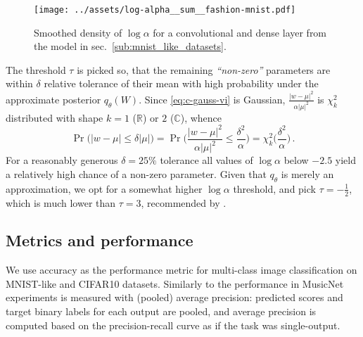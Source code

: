 \documentclass[a4paper,10pt]{article}
\newcommand{\real}{\mathbb{R}}
\newcommand{\cplx}{\mathbb{C}}
\begin{document}
\begin{figure}[ht]
  \centering
  \texttt{[image: ../assets/log-alpha\_\_sum\_\_fashion-mnist.pdf]}
  \caption{%
    Smoothed density of $\log\alpha$ for a convolutional and dense layer from the
    model in sec.~\ref{sub:mnist_like_datasets}.
  }
  \label{fig:log-alpha__mnist-like}
\end{figure}

The threshold $\tau$ is picked so, that the remaining \textit{``non-zero''} parameters
are within $\delta$ relative tolerance of their mean with high probability under the
approximate posterior $q_\theta(W)$. Since \eqref{eq:c-gauss-vi} is Gaussian, $
  \tfrac{\lvert w - \mu \rvert^2}
        {\alpha \lvert \mu \rvert^2}
$ is $\chi^2_k$ distributed with shape $k=1$ ($\real$) or $2$ ($\cplx$), whence
\begin{equation} \label{eq:prob_relevant}
  \Pr\bigl(
    \lvert w - \mu \rvert \leq \delta \lvert \mu \rvert
  \bigr)
    = \Pr\biggl(
      \frac{\lvert w - \mu \rvert^2}{\alpha \lvert \mu \rvert^2}
        \leq \frac{\delta^2}{\alpha}
    \biggr)
    = \chi^2_k\biggl(\frac{\delta^2}{\alpha}\biggr)
  \,.
\end{equation}
For a reasonably generous $\delta = 25\%$ tolerance all values of $\log \alpha$ below
$-2.5$ yield a relatively high chance of a non-zero parameter. Given that $q_\theta$
is merely an approximation, we opt for a somewhat higher $\log \alpha$ threshold, and
pick $\tau = -\tfrac12$, which is much lower than $\tau = 3$, recommended by
\citet{molchanov_variational_2017}.


\subsection{Metrics and performance} %
\label{sub:metrics_and_performance}

We use accuracy as the performance metric for multi-class image classification on MNIST-like
and CIFAR10 datasets. Similarly to \citet{trabelsi_deep_2017} the performance in MusicNet
experiments is measured with (pooled) average precision: predicted scores and target binary
labels for each output are pooled, and average precision is computed based on the precision-recall
curve as if the task was single-output.
\end{document}
